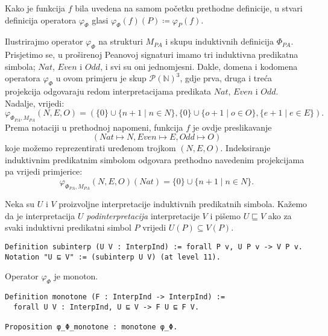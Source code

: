 \begin{remark}\label{remark:phi-phi-notation}
  Kako je funkcija \(f\) bila uvedena na samom početku prethodne definicije,
  u stvari definicija operatora \(\varphi_{\Phi}\) glasi
  \(
    \varphi_{\Phi}(f)(P) \coloneq \varphi_{P}(f)
  \).
\end{remark}

\begin{example}\label{ex:operator-phi-phi-PA}
  Ilustrirajmo operator \(\varphi_{\Phi}\) na strukturi \(M_{\mathit{PA}}\) i
  skupu induktivnih definicija \(\Phi_{\mathit{PA}}\).
  Prisjetimo se, u proširenoj Peanovoj signaturi imamo tri induktivna predikatna simbola;
  \(\mathit{Nat}\), \(\mathit{Even}\) i \(\mathit{Odd}\), i svi su oni jednomjesni.
  Dakle, domena i kodomena operatora \(\varphi_{\Phi}\) u ovom primjeru je skup \(\mathcal{P(\mathbb{N})}^{3}\),
  gdje prva, druga i treća projekcija odgovaraju redom interpretacijama predikata
  \(\mathit{Nat}\), \(\mathit{Even}\) i \(\mathit{Odd}\). Nadalje, vrijedi:
  \[
    \varphi_{\Phi_{\mathit{PA}}, M_{\mathit{PA}}}(N, E, O) =
    ( \{ 0 \} \cup \{ n + 1 \mid n \in N \},
    \{ 0 \} \cup \{ o + 1 \mid o \in O \},
    \{ e + 1 \mid e \in E \} ).
  \]
  \noindent Prema notaciji u prethodnoj napomeni,
  funkcija \(f\) je ovdje preslikavanje
  \[(\mathit{Nat} \mapsto \mathit{N}, \mathit{Even} \mapsto \mathit{E}, \mathit{Odd} \mapsto \mathit{O})\]
  koje možemo reprezentirati uređenom trojkom \((N, E, O)\).
  Indeksiranje induktivnim predikatnim simbolom odgovara prethodno
  navedenim projekcijama pa vrijedi primjerice:
  \[
    \varphi_{\Phi_{\mathit{PA}}, M_{\mathit{PA}}}(N, E, O)(\mathit{Nat}) = \{ 0 \} \cup \{ n + 1 \mid n \in N \}.
  \]
\end{example}

\begin{definition}
  Neka su \(U\) i \(V\) proizvoljne interpretacije induktivnih predikatnih simbola.
  Kažemo da je interpretacija \(U\) \textit{podinterpretacija} interpretacije \(V\)
  i pišemo \(U \sqsubseteq V\)
  ako za svaki induktivni predikatni simbol \(P\) vrijedi \(U(P) \subseteq V(P)\).
\begin{verbatim}
Definition subinterp (U V : InterpInd) := forall P v, U P v -> V P v.
Notation "U ⊑ V" := (subinterp U V) (at level 11).
\end{verbatim}
\end{definition}

\begin{proposition}
  Operator \(\varphi_{\Phi}\) je monoton.
\begin{verbatim}
Definition monotone (F : InterpInd -> InterpInd) :=
  forall U V : InterpInd, U ⊑ V -> F U ⊑ F V.

Proposition φ_Φ_monotone : monotone φ_Φ.
\end{verbatim}
\end{proposition}

